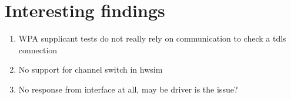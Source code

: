 \section{Interesting findings}

\begin{enumerate}
	\item WPA supplicant tests do not really rely on communication to check a tdls connection
	\item No support for channel switch in hwsim
	\item No response from interface at all, may be driver is the issue?
\end{enumerate}

